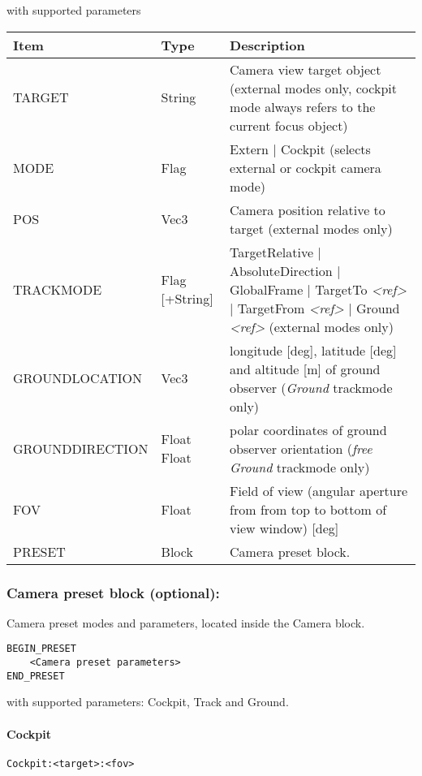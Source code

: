 \documentclass[Orbiter Developer Manual.tex]{subfiles}
\begin{document}
\noindent
with supported parameters

\begin{table}[H]
	\centering
	\begin{tabularx}{\textwidth}{ |l|l|X| }
	\hline\rule{0pt}{2ex}
	\textbf{Item} & \textbf{Type} & \textbf{Description}\\
	\hline\rule{0pt}{2ex}
	TARGET & String & Camera view target object (external modes only, cockpit mode always refers to the current focus object)\\
	\hline\rule{0pt}{2ex}
	MODE & Flag & Extern | Cockpit (selects external or cockpit camera mode)\\
	\hline\rule{0pt}{2ex}
	POS & Vec3 & Camera position relative to target (external modes only)\\
	\hline\rule{0pt}{2ex}
	TRACKMODE & Flag [+String] & TargetRelative | AbsoluteDirection | GlobalFrame | TargetTo \textit{<ref>} | TargetFrom \textit{<ref>} | Ground \textit{<ref>} (external modes only)\\
	\hline\rule{0pt}{2ex}
	GROUNDLOCATION & Vec3 & longitude [deg], latitude [deg] and altitude [m] of ground observer (\textit{Ground} trackmode only)\\
	\hline\rule{0pt}{2ex}
	GROUNDDIRECTION & Float Float & polar coordinates of ground observer orientation (\textit{free Ground} trackmode only)\\
	\hline\rule{0pt}{2ex}
	FOV & Float & Field of view (angular aperture from from top to bottom of view window) [deg]\\
	\hline\rule{0pt}{2ex}
	PRESET & Block & Camera preset block.\\
	\hline
	\end{tabularx}
\end{table}


\subsubsection*{Camera preset block (optional):}
Camera preset modes and parameters, located inside the Camera block.

\begin{lstlisting}[language=OSFS]
BEGIN_PRESET
	<Camera preset parameters>
END_PRESET
\end{lstlisting}

\noindent
with supported parameters: Cockpit, Track and Ground.

\paragraph{Cockpit}
\begin{lstlisting}[language=OSFS]
Cockpit:<target>:<fov>
\end{lstlisting}
\end{document}
